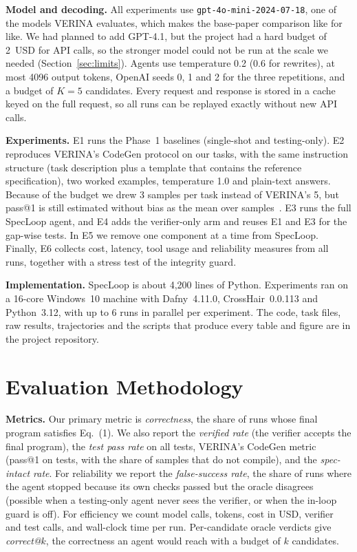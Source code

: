 \textbf{Model and decoding.} All experiments use \texttt{gpt-4o-mini-2024-07-18}, one of the models VERINA evaluates, which makes the base-paper comparison like for like. We had planned to add GPT-4.1, but the project had a hard budget of 2~USD for API calls, so the stronger model could not be run at the scale we needed (Section~\ref{sec:limits}). Agents use temperature 0.2 (0.6 for rewrites), at most 4096 output tokens, OpenAI seeds 0, 1 and 2 for the three repetitions, and a budget of $K = 5$ candidates. Every request and response is stored in a cache keyed on the full request, so all runs can be replayed exactly without new API calls.

\textbf{Experiments.} E1 runs the Phase~1 baselines (single-shot and testing-only). E2 reproduces VERINA's CodeGen protocol on our tasks, with the same instruction structure (task description plus a template that contains the reference specification), two worked examples, temperature 1.0 and plain-text answers. Because of the budget we drew 3 samples per task instead of VERINA's 5, but pass@1 is still estimated without bias as the mean over samples~\cite{chen2021codex}. E3 runs the full SpecLoop agent, and E4 adds the verifier-only arm and reuses E1 and E3 for the gap-wise tests. In E5 we remove one component at a time from SpecLoop. Finally, E6 collects cost, latency, tool usage and reliability measures from all runs, together with a stress test of the integrity guard.

\textbf{Implementation.} SpecLoop is about 4,200 lines of Python. Experiments ran on a 16-core Windows~10 machine with Dafny~4.11.0, CrossHair~0.0.113 and Python~3.12, with up to 6 runs in parallel per experiment. The code, task files, raw results, trajectories and the scripts that produce every table and figure are in the project repository.

\section{Evaluation Methodology}
\label{sec:eval}

\textbf{Metrics.} Our primary metric is \emph{correctness}, the share of runs whose final program satisfies Eq.~(1). We also report the \emph{verified rate} (the verifier accepts the final program), the \emph{test pass rate} on all tests, VERINA's CodeGen metric (pass@1 on tests, with the share of samples that do not compile), and the \emph{spec-intact rate}. For reliability we report the \emph{false-success rate}, the share of runs where the agent stopped because its own checks passed but the oracle disagrees (possible when a testing-only agent never sees the verifier, or when the in-loop guard is off). For efficiency we count model calls, tokens, cost in USD, verifier and test calls, and wall-clock time per run. Per-candidate oracle verdicts give \emph{correct@$k$}, the correctness an agent would reach with a budget of $k$ candidates.

